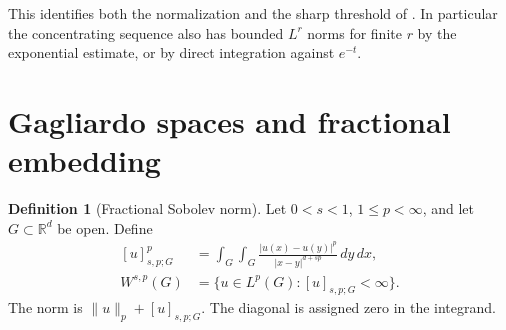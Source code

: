 \documentclass[11pt,oneside,openany]{book}
\theoremstyle{definition}
\newtheorem{definition}[theorem]{Definition}
\theoremstyle{remark}
\begin{document}
This identifies both the normalization and the sharp threshold of
\cite{moser}. In particular the concentrating sequence also has
bounded \(L^r\) norms for finite \(r\) by the exponential estimate,
or by direct integration against \(e^{-t}\).

\section{Gagliardo spaces and fractional embedding}

\begin{definition}[Fractional Sobolev norm]\label{p102:U5-04}
Let \(0<s<1\), \(1\le p<\infty\), and let \(G\subset\mathbb R^d\)
be open. Define
\[
 \begin{aligned}
 [u]_{s,p;G}^p
 &=\int_G\int_G\frac{|u(x)-u(y)|^p}{|x-y|^{d+sp}}\,dy\,dx,\\
 W^{s,p}(G)&=\{u\in L^p(G):[u]_{s,p;G}<\infty\}.
 \end{aligned}
\]
The norm is \(\|u\|_p+[u]_{s,p;G}\). The diagonal is assigned
zero in the integrand.
\end{definition}
\end{document}
